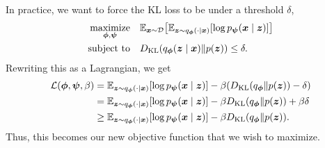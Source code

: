 In practice, we want to force the KL loss to be under a threshold $\delta$,
\begin{align*}
    \underset{\vec{\phi},\vec{\psi}}{\text{maximize}} & \quad \E_{\vec{x} \sim \mathcal{D}} \lft[ \E_{\vec{z} \sim q_{\vec{\phi}}(\cdot \mid \vec{x})} \lft[ \log p_{\vec{\psi}}(\vec{x} \mid \vec{z}) \rgt] \rgt] \\
    \text{subject to}                                 & \quad D_{\mathrm{KL}} \lft( q_{\vec{\phi}}(\vec{z} \mid \vec{x}) \lVert p(\vec{z}) \rgt) \leq \delta.
\end{align*}
Rewriting this as a Lagrangian, we get
\begin{align*}
    \mathcal{L}(\bm{\phi},\bm{\psi},\beta) & = \mathbb{E}_{\bm{z} \sim q_{\bm{\phi}}(\cdot \mid \bm{x})} [\log p_{\bm{\psi}}(\bm{x} \mid \bm{z})] - \beta(D_{\mathrm{KL}}(q_{\bm{\phi}} \lVert p(\bm{z})) - \delta)      \\
                                             & = \mathbb{E}_{\bm{z} \sim q_{\bm{\phi}}(\cdot \mid \bm{x})} [\log p_{\bm{\psi}}(\bm{x} \mid \bm{z})] - \beta D_{\mathrm{KL}}(q_{\bm{\phi}} \lVert p(\bm{z})) + \beta \delta \\
                                             & \geq \mathbb{E}_{\bm{z} \sim q_{\bm{\phi}}(\cdot \mid \bm{x})} [\log p_{\bm{\psi}}(\bm{x} \mid \bm{z})] - \beta D_{\mathrm{KL}}(q_{\bm{\phi}} \lVert p(\bm{z})).
\end{align*}
Thus, this becomes our new objective function that we wish to maximize.
